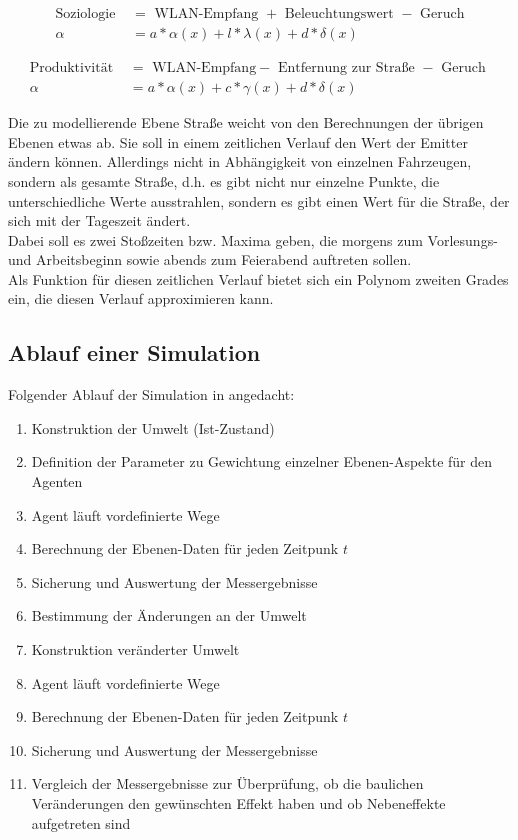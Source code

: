 \documentclass[10pt]{scrartcl}
\begin{document}
\begin{align}
	\text{Soziologie } &= \text{ WLAN-Empfang } + \text{ Beleuchtungswert } - \text{ Geruch}\\
	\alpha &= a * \alpha(x) + l * \lambda(x) + d * \delta(x)
\end{align}

\begin{align}
	\text{Produktivität } &= \text{ WLAN-Empfang} - \text{ Entfernung zur Straße } - \text{ Geruch }\\
	\alpha &= a * \alpha(x) + c * \gamma(x) + d * \delta(x)
\end{align}


Die zu modellierende Ebene Straße weicht von den Berechnungen der übrigen Ebenen etwas ab. Sie soll in einem zeitlichen Verlauf den Wert der Emitter ändern können. Allerdings nicht in Abhängigkeit von einzelnen Fahrzeugen, sondern als gesamte Straße, d.h. es gibt nicht nur einzelne Punkte, die unterschiedliche Werte ausstrahlen, sondern es gibt einen Wert für die Straße, der sich mit der Tageszeit ändert.\\
Dabei soll es zwei Stoßzeiten bzw. Maxima geben, die morgens zum Vorlesungs- und Arbeitsbeginn sowie abends zum Feierabend auftreten sollen.\\
Als Funktion für diesen zeitlichen Verlauf bietet sich ein Polynom zweiten Grades ein, die diesen Verlauf approximieren kann.

\subsection{Ablauf einer Simulation}
Folgender Ablauf der Simulation in angedacht:

\begin{enumerate}
\item Konstruktion der Umwelt (Ist-Zustand)
\item Definition der Parameter zu Gewichtung einzelner Ebenen-Aspekte für den Agenten
\item Agent läuft vordefinierte Wege
\item Berechnung der Ebenen-Daten für jeden Zeitpunk $t$
\item Sicherung und Auswertung der Messergebnisse
\item Bestimmung der Änderungen an der Umwelt
\item Konstruktion veränderter Umwelt
\item Agent läuft vordefinierte Wege
\item Berechnung der Ebenen-Daten für jeden Zeitpunk $t$
\item Sicherung und Auswertung der Messergebnisse
\item Vergleich der Messergebnisse zur Überprüfung, ob die baulichen Veränderungen den gewünschten Effekt haben und ob Nebeneffekte aufgetreten sind
\end{enumerate}
\end{document}
